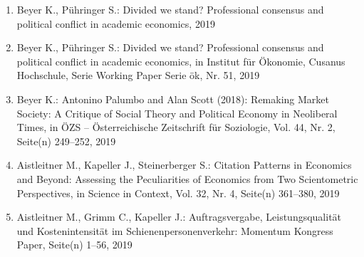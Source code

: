 \begin{enumerate}
	 \item Beyer K., Pühringer S.: Divided we stand? Professional consensus and political conflict in academic economics, 2019
	 \item Beyer K., Pühringer S.: Divided we stand? Professional consensus and political conflict in academic economics, in Institut für Ökonomie, Cusanus Hochschule, Serie Working Paper Serie ök, Nr. 51, 2019
	 \item Beyer K.: Antonino Palumbo and Alan Scott (2018): Remaking Market Society: A Critique of Social Theory and Political Economy in Neoliberal Times, in ÖZS -- Österreichische Zeitschrift für Soziologie, Vol. 44, Nr. 2, Seite(n) 249--252, 2019
	 \item Aistleitner M., Kapeller J., Steinerberger S.: Citation Patterns in Economics and Beyond: Assessing the Peculiarities of Economics from Two Scientometric Perspectives, in Science in Context, Vol. 32, Nr. 4, Seite(n) 361--380, 2019
	 \item Aistleitner M., Grimm C., Kapeller J.: Auftragsvergabe, Leistungsqualität und Kostenintensität im Schienenpersonenverkehr: Momentum Kongress Paper, Seite(n) 1--56, 2019
\end{enumerate}
